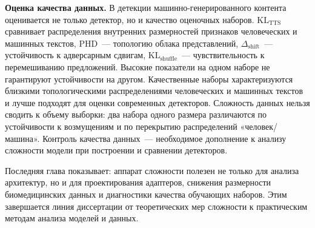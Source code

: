 \documentclass{dissert}
\newcommand{\paragraph}[1]{\noindent\textbf{#1}\quad}
\begin{document}
\paragraph{Оценка качества данных.}
В детекции машинно-генерированного контента оценивается не только детектор, но и качество оценочных наборов.
$\text{KL}_{\text{TTS}}$ сравнивает распределения внутренних размерностей признаков человеческих и машинных текстов, PHD~--- топологию облака представлений, $\Delta_{\text{shift}}$~--- устойчивость к адверсарным сдвигам, $\text{KL}_{\text{shuffle}}$~--- чувствительность к перемешиванию предложений.
Высокие показатели на одном наборе не гарантируют устойчивости на другом.
Качественные наборы характеризуются близкими топологическими распределениями человеческих и машинных текстов и лучше подходят для оценки современных детекторов.
Сложность данных нельзя сводить к объему выборки: два набора одного размера различаются по устойчивости к возмущениям и по перекрытию распределений «человек/машина».
Контроль качества данных~--- необходимое дополнение к анализу сложности модели при построении и сравнении детекторов.

Последняя глава показывает: аппарат сложности полезен не только для анализа архитектур, но и для проектирования адаптеров, снижения размерности биомедицинских данных и диагностики качества обучающих наборов.
Этим завершается линия диссертации от теоретических мер сложности к практическим методам анализа моделей и данных.
\end{document}
